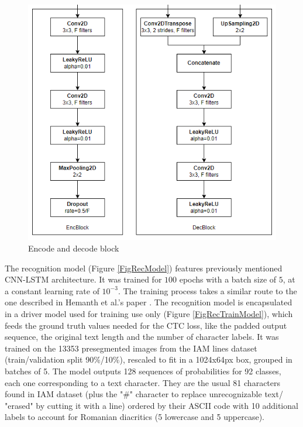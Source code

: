 \begin{figure}[htbp]
    \centering
        \includegraphics[scale=0.4]{figures/encdec_block.PNG}
    \caption{Encode and decode block}    
    \label{FigEncDecBlock}
\end{figure}


The recognition model (Figure \ref{FigRecModel}) features previously mentioned CNN-LSTM architecture. It was trained for $100$ epochs with a batch size of $5$, at a constant learning rate of $10^{-3}$. The training process takes a similar route to the one described in Hemanth et al.'s  paper \cite{cnnrnn}. The recognition model is encapsulated in a driver model used for training use only (Figure \ref{FigRecTrainModel}), which feeds the ground truth values needed for the CTC loss, like the padded output sequence, the original text length and   the number of character labels. It was trained on the 13353 presegmented images from the IAM lines dataset (train/validation split 90\%/10\%), rescaled to fit in a 1024x64px box, grouped in batches of 5. The model outputs 128 sequences of probabilities for 92 classes, each one corresponding to a text character. They are the usual 81 characters found in IAM dataset (plus the "\#" character to replace unrecognizable text/ "erased" by cutting it with a line) ordered by their ASCII code with 10 additional labels to account for Romanian diacritics (5 lowercase and 5 uppercase).

